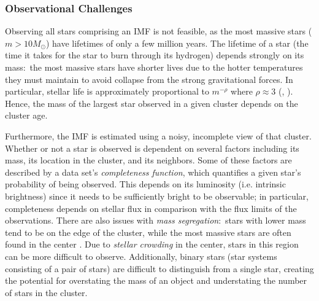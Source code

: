 \documentclass[ejs]{imsart}
\numberwithin{equation}{section}
\theoremstyle{plain}
\newcommand{\Msun}{M_{\odot}}
\begin{document}
\subsubsection{Observational Challenges} \label{sec:observational}
Observing all stars comprising an IMF 
is not feasible, as the most massive stars ($m > 10 \Msun$) have lifetimes of 
only a few million years.
The lifetime of a star (the time it takes for the star to burn through its
hydrogen) depends strongly on its mass:~the most massive
stars have shorter lives due to the hotter temperatures they must maintain
to avoid collapse from the strong gravitational forces. In particular,
stellar life is 
approximately proportional to $m^{-\rho}$ 
where $\rho \approx 3$ (\citealt[p. 30]{hansen2004}, \citealt[p. 439]{Chaisson:2011}). 
Hence, the mass of the largest star observed in a given 
cluster depends on the cluster age.  %

Furthermore, the IMF is estimated using a noisy, incomplete view of that cluster.  Whether or not a star is observed is dependent on several factors including its mass, its location in the cluster, and its neighbors.  Some of these factors are described by a data set's \emph{completeness function}, which quantifies a given star's probability of being observed.  This depends on its luminosity (i.e. intrinsic brightness) since it needs to be sufficiently bright to be observable; in particular, completeness depends on stellar flux in comparison with the flux limits of the observations.
There are also issues with {\it mass segregation}:~stars with lower mass tend to be on the edge of the cluster, while the most massive stars are often
found in the center \citep{weisz13}. Due to {\it stellar crowding} in the center, stars in this region can be more difficult to observe.  Additionally, binary stars (star systems consisting of a pair of stars) 
are difficult to distinguish from a single star, creating the potential for overstating the mass of an object and understating the number of stars in the cluster.
\end{document}
